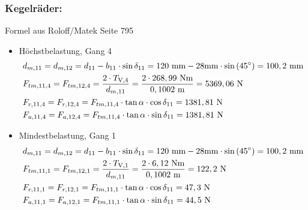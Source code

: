 \subsubsection {Kegelräder:}
Formel aus Roloff/Matek Seite 795 
\begin{itemize}
\item Höchstbelastung, Gang 4
	\begin{align*}
	&d_{m,11} = d_{m,12}= d_{11} - b_{11} \cdot \sin{\delta_{11}} = 120 \text{ mm} - 28\text{mm} \cdot \sin{(45^\circ)} = 100,2 \text{ mm}\\ 
	&F_{tm,11,4} = F_{tm,12,4}= \frac{2 \cdot T_{\mathrm{V},4}}{d_{m,11}} = \frac{2 \cdot 268,99 \text{ Nm} } {0,1002 \text{ m}} = 5369,06 \text{ N}\\
	&F_{r,11,4} = F_{r,12,4} = F_{tm,11,4} \cdot \tan{\alpha} \cdot \cos{\delta_{11}} =1381,81 \text{ N}\\ 
	&F_{a,11,4} = F_{a,12,4} =F_{tm,11,4}\cdot \tan{\alpha} \cdot \sin{\delta_{11}} = 1381,81 \text{ N} \\ 
\end{align*}
\item Mindestbelastung, Gang 1
	\begin{align*}
	&d_{m,11} = d_{m,12}= d_{11} - b_{11} \cdot \sin{\delta_{11}} = 120 \text{ mm} - 28\text{mm} \cdot \sin{(45^\circ)} = 100,2 \text{ mm}\\ 
	&F_{tm,11,1} = F_{tm,12,1}= \frac{2 \cdot T_{\mathrm{V},1}}{d_{m,11}} = \frac{2 \cdot 6,12 \text{ Nm} } {0,1002 \text{ m}} = 122,2 \text{ N}\\
	&F_{r,11,1} = F_{r,12,1} = F_{tm,11,1} \cdot \tan{\alpha} \cdot \cos{\delta_{11}} =47,3 \text{ N}\\ 
	&F_{a,11,1} = F_{a,12,1} =F_{tm,11,1}\cdot \tan{\alpha} \cdot \sin{\delta_{11}} = 44,5 \text{ N} \\ 
\end{align*}
\end{itemize}